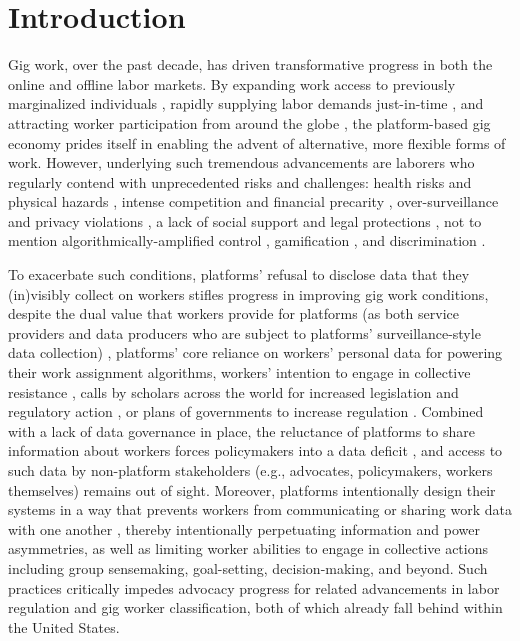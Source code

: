 \chapter{Introduction}\label{ch:introduction}
Gig work, over the past decade, has driven transformative progress in both the online and offline labor markets. 
By expanding work access to previously marginalized individuals \cite{moving, disabled}, rapidly supplying labor demands just-in-time \cite{jit, making}, and attracting worker participation from around the globe \cite{woborders}, the platform-based gig economy prides itself in enabling the advent of alternative, more flexible forms of work. 
However, underlying such tremendous advancements are laborers who regularly contend with unprecedented risks and challenges: health risks and physical hazards \cite{body, health, technostress, Almoqbel2019-in}, intense competition and financial precarity \cite{dark, precarity, france, km}, over-surveillance and privacy violations \cite{surveillance, privacy}, a lack of social support and legal protections \cite{atom, category, employment}, not to mention algorithmically-amplified control \cite{locus, good}, gamification \cite{game, ludification}, and discrimination \cite{Leung2020-rk, Gelles-Watnick2021-fz, Rosenblat2017-bm}.

To exacerbate such conditions, platforms' refusal to disclose data that they (in)visibly collect on workers stifles progress in improving gig work conditions, despite the dual value that workers provide for platforms (as both service providers and data producers who are subject to platforms' surveillance-style data collection) \cite{dual}, platforms' core reliance on workers' personal data for powering their work assignment algorithms, workers' intention to engage in collective resistance \cite{boss}, calls by scholars across the world for increased legislation and regulatory action \cite{regulate, organizing}, or plans of governments to increase regulation \cite{deficit}. Combined with a lack of data governance in place, the reluctance of platforms to share information about workers forces policymakers into a data deficit \cite{deficit}, and access to such data by non-platform stakeholders (e.g., advocates, policymakers, workers themselves) remains out of sight. Moreover, platforms intentionally design their systems in a way that prevents workers from communicating or sharing work data with one another \cite{uuapp}, thereby intentionally perpetuating information and power asymmetries, as well as limiting worker abilities to engage in collective actions including group sensemaking, goal-setting, decision-making, and beyond. Such practices critically impedes advocacy progress for related advancements in labor regulation and gig worker classification, both of which already fall behind within the United States.

